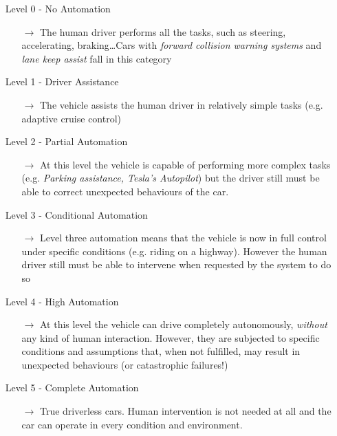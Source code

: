 \begin{itemize}
	\item[Level 0 -] No Automation
	\begin{itemize}
		\item[$\rightarrow$] The human driver performs all the tasks, such as steering, accelerating, braking\dots Cars with \textsl{forward collision warning systems} and \textsl{lane keep assist} fall in this category
	\end{itemize}
	\item[Level 1 -] Driver Assistance
	\begin{itemize}
		\item[$\rightarrow$] The vehicle assists the human driver in relatively simple tasks (e.g. adaptive cruise control)
	\end{itemize}
	\item[Level 2 -] Partial Automation
	\begin{itemize}
		\item[$\rightarrow$] At this level the vehicle is capable of performing more complex tasks (e.g. \textsl{Parking assistance, Tesla's Autopilot}) but the driver still must be able to correct unexpected behaviours of the car.
	\end{itemize}
	\item[Level 3 -] Conditional Automation
	\begin{itemize}
		\item[$\rightarrow$ ] Level three automation means that the vehicle is now in full control under specific conditions (e.g. riding on a highway). However the human driver still must be able to intervene when requested by the system to do so
	\end{itemize}
	\item[Level 4 -] High Automation
	\begin{itemize}
		\item[$\rightarrow$] At this level the vehicle can drive completely autonomously, \textsl{without} any kind of human interaction. However, they are subjected to specific conditions and assumptions that, when not fulfilled, may result in unexpected behaviours (or catastrophic failures!)
	\end{itemize}
	\item[Level 5 -] Complete Automation
	\begin{itemize}
		\item[$\rightarrow$] True driverless cars. Human intervention is not needed at all and the car can operate in every condition and environment.
	\end{itemize}
\end{itemize}

